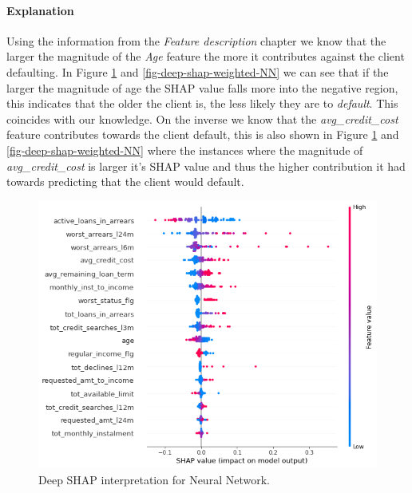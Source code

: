 \paragraph{Explanation}
Using the information from the \emph{Feature description} chapter we know that the larger the magnitude of the \emph{Age} feature the more it contributes against the client defaulting. In Figure \ref{fig-deep-shap-NN} and \ref{fig-deep-shap-weighted-NN} we can see that if the larger the magnitude of age the SHAP value falls more into the negative region, this indicates that the older the client is, the less likely they are to \emph{default}. This coincides with our knowledge. On the inverse we know that the \emph{avg\_credit\_cost} feature contributes towards the client default, this is also shown in Figure \ref{fig-deep-shap-NN} and \ref{fig-deep-shap-weighted-NN} where the instances where the magnitude of \emph{avg\_credit\_cost} is larger it's SHAP value and thus the higher contribution it had towards predicting that the client would default.

\begin  {figure}[!htpb]
\centering
  \includegraphics[width=0.8\linewidth]{Credit_Images/NN_shap_deep_summary.png}
   \caption{Deep SHAP interpretation for Neural Network.}
    \label{fig-deep-shap-NN}
\end{figure}

